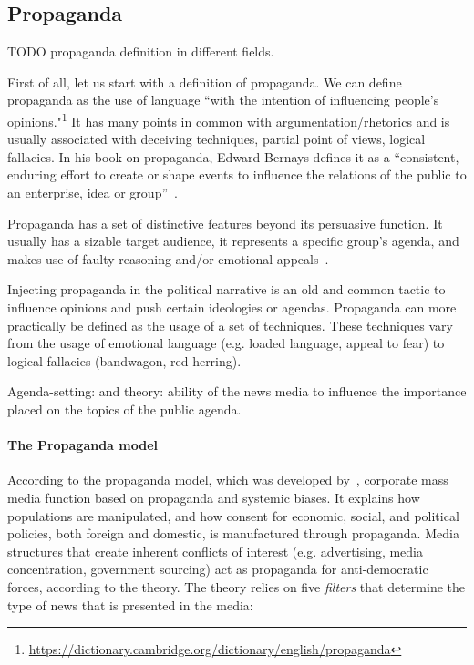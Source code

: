 \subsection{Propaganda}
\label{sec:lit_propaganda}
TODO propaganda definition in different fields.

First of all, let us start with a definition of propaganda.
We can define propaganda as the use of language ``with the intention of influencing people's opinions."\footnote{\url{https://dictionary.cambridge.org/dictionary/english/propaganda}}
It has many points in common with argumentation/rhetorics and is usually associated with deceiving techniques, partial point of views, logical fallacies.
In his book on propaganda, Edward Bernays defines it as a ``consistent, enduring effort to create or shape events to influence the relations of the public to an enterprise, idea or group''~\cite{bernays}.

Propaganda has a set of distinctive features beyond its persuasive function. It usually has a sizable target audience, it represents a specific group's agenda, and makes use of faulty reasoning and/or emotional appeals~\cite{miller1939techniques}.

Injecting propaganda in the political narrative is an old and common tactic to influence opinions and push certain ideologies or agendas.
Propaganda can more practically be defined as the usage of a set of techniques. These techniques vary from the usage of emotional language (e.g. loaded language, appeal to fear) to logical fallacies (bandwagon, red herring).

Agenda-setting: \cite{Cohen_1964} and \cite{mccombs1972agenda} theory: ability of the news media to influence the importance placed on the topics of the public agenda.

\paragraph{The Propaganda model}

According to the propaganda model, which was developed by~\citet{herman1988manufacturing}, corporate mass media function based on propaganda and systemic biases. It explains how populations are manipulated, and how consent for economic, social, and political policies, both foreign and domestic, is manufactured through propaganda. Media structures that create inherent conflicts of interest (e.g. advertising, media concentration, government sourcing) act as propaganda for anti-democratic forces, according to the theory.
The theory relies on five \emph{filters} that determine the type of news that is presented in the media:

